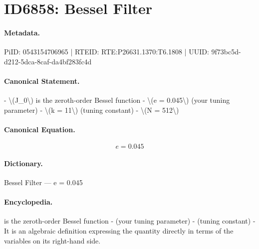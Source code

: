\section*{ID6858: Bessel Filter}
\paragraph{Metadata.}
PiID: 0543154706965 | RTEID: RTE:P26631.1370:T6.1808 | UUID: 9f73bc5d-d212-5dca-8caf-da4bf283fc4d

\paragraph{Canonical Statement.}
- \textbackslash{}(J\_0\textbackslash{}) is the zeroth-order Bessel function - \textbackslash{}(e = 0.045\textbackslash{}) (your tuning parameter) - \textbackslash{}(k = 11\textbackslash{}) (tuning constant) - \textbackslash{}(N = 512\textbackslash{})

\paragraph{Canonical Equation.}
\[
e = 0.045
\]

\paragraph{Dictionary.}
Bessel Filter — e = 0.045

\paragraph{Encyclopedia.}
is the zeroth-order Bessel function - (your tuning parameter) - (tuning constant) - It is an algebraic definition expressing the quantity directly in terms of the variables on its right-hand side.
